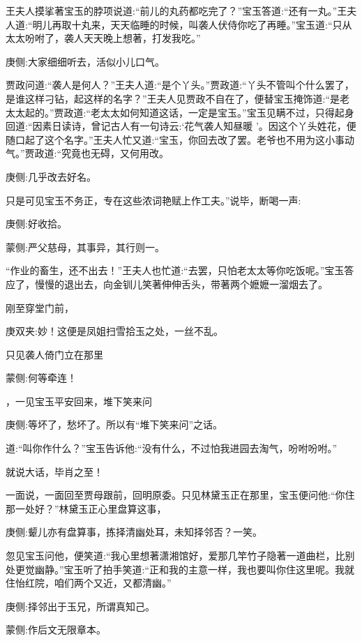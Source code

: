 \begin{parag}
    王夫人摸挲著宝玉的脖项说道:“前儿的丸药都吃完了？”宝玉答道:“还有一丸。”王夫人道:“明儿再取十丸来，天天临睡的时候，叫袭人伏侍你吃了再睡。”宝玉道:“只从太太吩咐了，袭人天天晚上想著，打发我吃。”\begin{note}庚侧:大家细细听去，活似小儿口气。\end{note}贾政问道:“袭人是何人？”王夫人道:“是个丫头。”贾政道:“丫头不管叫个什么罢了，是谁这样刁钻，起这样的名字？”王夫人见贾政不自在了，便替宝玉掩饰道:“是老太太起的。”贾政道:“老太太如何知道这话，一定是宝玉。”宝玉见瞒不过，只得起身回道:“因素日读诗，曾记古人有一句诗云:‘花气袭人知昼暖 ’。因这个丫头姓花，便随口起了这个名字。”王夫人忙又道:“宝玉，你回去改了罢。老爷也不用为这小事动气。”贾政道:“究竟也无碍，又何用改。\begin{note}庚侧:几乎改去好名。\end{note}只是可见宝玉不务正，专在这些浓词艳赋上作工夫。”说毕，断喝一声:\begin{note}庚侧:好收拾。\end{note}\begin{note}蒙侧:严父慈母，其事异，其行则一。\end{note}“作业的畜生，还不出去！”王夫人也忙道:“去罢，只怕老太太等你吃饭呢。”宝玉答应了，慢慢的退出去，向金钏儿笑著伸伸舌头，带著两个嬷嬷一溜烟去了。
\end{parag}


\begin{parag}
    刚至穿堂门前，\begin{note}庚双夹:妙！这便是凤姐扫雪拾玉之处，一丝不乱。\end{note}只见袭人倚门立在那里\begin{note}蒙侧:何等牵连！\end{note}，一见宝玉平安回来，堆下笑来问\begin{note}庚侧:等坏了，愁坏了。所以有“堆下笑来问”之话。\end{note}道:“叫你作什么？”宝玉告诉他:“没有什么，不过怕我进园去淘气，吩咐吩咐。”\begin{note}就说大话，毕肖之至！\end{note}一面说，一面回至贾母跟前，回明原委。只见林黛玉正在那里，宝玉便问他:“你住那一处好？”林黛玉正心里盘算这事，\begin{note}庚侧:颦儿亦有盘算事，拣择清幽处耳，未知择邻否？一笑。\end{note}忽见宝玉问他，便笑道:“我心里想著潇湘馆好，爱那几竿竹子隐著一道曲栏，比别处更觉幽静。”宝玉听了拍手笑道:“正和我的主意一样，我也要叫你住这里呢。我就住怡红院，咱们两个又近，又都清幽。”\begin{note}庚侧:择邻出于玉兄，所谓真知己。\end{note}\begin{note}蒙侧:作后文无限章本。\end{note}
\end{parag}


